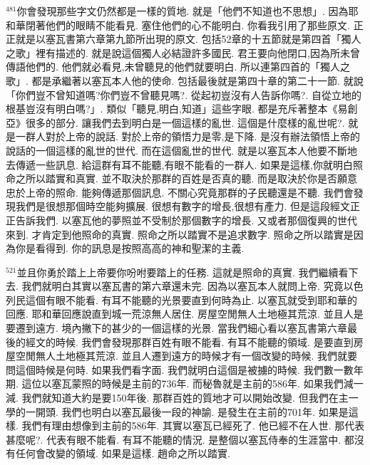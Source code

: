 \documentclass{book}
\begin{document}
$^{481}$你會發現那些字文仍然都是一樣的質地.
就是「他們不知道也不思想」.
因為耶和華閉著他們的眼睛不能看見.
塞住他們的心不能明白.
你看我引用了那些原文.
正正就是以塞瓦書第六章第九節所出現的原文.
包括52章的十五節就是第四首「獨人之歌」裡有描述的.
就是說這個獨人必結證許多國民.
君王要向他閉口,因為所未曾傳語他們的.
他們就必看見,未曾聽見的他們就要明白.
所以連第四首的「獨人之歌」.
都是承繼著以塞瓦本人他的使命.
包括最後就是第四十章的第二十一節.
就說「你們豈不曾知道嗎?你們豈不曾聽見嗎?.
從起初豈沒有人告訴你嗎?.
自從立地的根基豈沒有明白嗎?」.
類似「聽見,明白,知道」這些字眼.
都是充斥著整本《易創亞》很多的部分.
讓我們去到明白是一個這樣的亂世.
這個是什麼樣的亂世呢?.
就是一群人對於上帝的說話.
對於上帝的領悟力是零,是下降.
是沒有辦法領悟上帝的說話的一個這樣的亂世的世代.
而在這個亂世的世代.
就是以塞瓦本人他要不斷地去傳遞一些訊息.
給這群有耳不能聽,有眼不能看的一群人.
如果是這樣,你就明白照命之所以踏實和真實.
並不取決於那群的百姓是否真的聽.
而是取決於你是否願意忠於上帝的照命.
能夠傳遞那個訊息.
不關心究竟那群的子民聽還是不聽.
我們會發現我們是很想那個時空能夠擴展.
很想有數字的增長,很想有產力.
但是這段經文正正告訴我們.
以塞瓦他的夢照並不受制於那個數字的增長.
又或者那個復興的世代來到.
才肯定到他照命的真實.
照命之所以踏實不是追求數字.
照命之所以踏實是因為你是看得到.
你的訊息是按照高高的神和聖潔的主義.

$^{521}$並且你勇於踏上上帝要你吩咐要踏上的任務.
這就是照命的真實.
我們繼續看下去.
我們就明白其實以塞瓦書的第六章還未完.
因為以塞瓦本人就問上帝.
究竟以色列民這個有眼不能看.
有耳不能聽的光景要直到何時為止.
以塞瓦就受到耶和華的回應.
耶和華回應說直到城一荒涼無人居住.
房屋空閒無人土地極其荒涼.
並且人是要遷到遠方.
境內撇下的甚少的一個這樣的光景.
當我們細心看以塞瓦書第六章最後的經文的時候.
我們會發現那群百姓有眼不能看.
有耳不能聽的領域.
是要直到房屋空閒無人土地極其荒涼.
並且人遷到遠方的時候才有一個改變的時候.
我們就要問這個時候是何時.
如果我們看字面.
我們就明白這個是被擄的時候.
我們數一數年期.
這位以塞瓦蒙照的時候是主前的736年.
而秘魯就是主前的586年.
如果我們減一減.
我們就知道大約是要150年後.
那群百姓的質地才可以開始改變.
但我們在主一學的一開頭.
我們也明白以塞瓦最後一段的神諭.
是發生在主前的701年.
如果是這樣.
我們有理由想像到主前的586年.
其實以塞瓦已經死了.
他已經不在人世.
那代表甚麼呢?.
代表有眼不能看.
有耳不能聽的情況.
是整個以塞瓦侍奉的生涯當中.
都沒有任何會改變的領域.
如果是這樣.
趙命之所以踏實.
\end{document}
